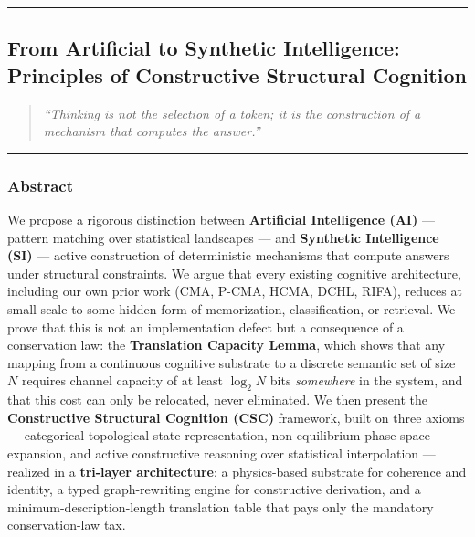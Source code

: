 \documentclass[
  11pt,
  a4paper,
]{article}
\begin{document}
\begin{center}\rule{0.5\linewidth}{0.5pt}\end{center}

\newpage

\subsection{From Artificial to Synthetic Intelligence: Principles of
Constructive Structural
Cognition}\label{from-artificial-to-synthetic-intelligence-principles-of-constructive-structural-cognition-1}

\begin{quote}
\emph{``Thinking is not the selection of a token; it is the construction
of a mechanism that computes the answer.''}
\end{quote}

\begin{center}\rule{0.5\linewidth}{0.5pt}\end{center}

\subsubsection{Abstract}\label{abstract}

We propose a rigorous distinction between \textbf{Artificial
Intelligence (AI)} --- pattern matching over statistical landscapes ---
and \textbf{Synthetic Intelligence (SI)} --- active construction of
deterministic mechanisms that compute answers under structural
constraints. We argue that every existing cognitive architecture,
including our own prior work (CMA, P-CMA, HCMA, DCHL, RIFA), reduces at
small scale to some hidden form of memorization, classification, or
retrieval. We prove that this is not an implementation defect but a
consequence of a conservation law: the \textbf{Translation Capacity
Lemma}, which shows that any mapping from a continuous cognitive
substrate to a discrete semantic set of size \(N\) requires channel
capacity of at least \(\log_2 N\) bits \emph{somewhere} in the system,
and that this cost can only be relocated, never eliminated. We then
present the \textbf{Constructive Structural Cognition (CSC)} framework,
built on three axioms --- categorical-topological state representation,
non-equilibrium phase-space expansion, and active constructive reasoning
over statistical interpolation --- realized in a \textbf{tri-layer
architecture}: a physics-based substrate for coherence and identity, a
typed graph-rewriting engine for constructive derivation, and a
minimum-description-length translation table that pays only the
mandatory conservation-law tax.
\end{document}
